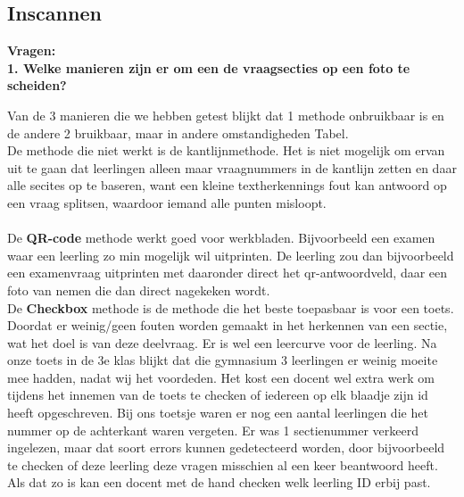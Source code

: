 \documentclass[12pt]{article}
\begin{document}
\subsection{Inscannen}
\textbf{Vragen:}\\
\textbf{1. Welke manieren zijn er om een de vraagsecties op een foto te scheiden?} 
\begin{multicols}{2}
Van de 3 manieren die we hebben getest blijkt dat 1 methode onbruikbaar is en de andere 2 bruikbaar, maar in andere omstandigheden Tabel.\\
De methode die niet werkt is de kantlijnmethode. Het is niet mogelijk om ervan uit te gaan dat leerlingen alleen maar vraagnummers in de kantlijn zetten en daar alle secites op te baseren, want een kleine textherkennings fout kan antwoord op een vraag splitsen, waardoor iemand alle punten misloopt. \\
\\
De \textbf{QR-code} methode werkt goed voor werkbladen. Bijvoorbeeld een examen waar een leerling zo min mogelijk wil uitprinten. De leerling zou dan bijvoorbeeld een examenvraag uitprinten met daaronder direct het qr-antwoordveld, daar een foto van nemen die dan direct nagekeken wordt. 
\\
De \textbf{Checkbox} methode is de methode die het beste toepasbaar is voor een toets. Doordat er weinig/geen fouten worden gemaakt in het herkennen van een sectie, wat het doel is van deze deelvraag. Er is wel een leercurve voor de leerling. Na onze toets in de 3e klas blijkt dat die gymnasium 3 leerlingen er weinig moeite mee hadden, nadat wij het voordeden. Het kost een docent wel extra werk om tijdens het innemen van de toets te checken of iedereen op elk blaadje zijn id heeft opgeschreven. Bij ons toetsje waren er nog een aantal leerlingen die het nummer op de achterkant waren vergeten. Er was 1 sectienummer verkeerd ingelezen, maar dat soort errors kunnen gedetecteerd worden, door bijvoorbeeld te checken of deze leerling deze vragen misschien al een keer beantwoord heeft. Als dat zo is kan een docent met de hand checken welk leerling ID erbij past. 

\end{multicols}
\end{document}
